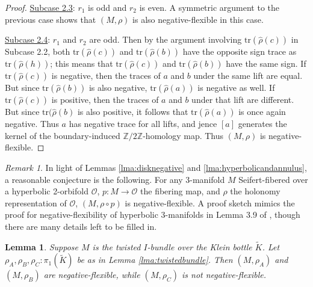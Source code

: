 \documentclass{article}
\theoremstyle{plain}
\theoremstyle{definition}
\theoremstyle{plain}
\theoremstyle{plain}
\theoremstyle{plain}
\newtheorem{lemma}[theorem]{Lemma}
\theoremstyle{remark}
\newtheorem{remark}[theorem]{Remark}
\theoremstyle{remark}
\theoremstyle{plain}
\theoremstyle{plain}
\begin{document}
\begin{proof}
\smallskip

\underline{Subcase 2.3}: $r_1$ is odd and $r_2$ is even. A symmetric argument to the previous case shows that $(M, \rho)$ is also negative-flexible in this case. 

\smallskip

\underline{Subcase 2.4}: $r_1$ and $r_2$ are odd. Then by the argument involving $\text{tr}(\hat{\rho}(c))$ in Subcase 2.2, both $\text{tr}(\hat{\rho}(c))$ and $\text{tr}(\hat{\rho}(b))$ have the opposite sign trace as $\text{tr}(\hat{\rho}(h))$; this means that $\text{tr}(\hat{\rho}(c))$ and $\text{tr}(\hat{\rho}(b))$ have the same sign. If $\text{tr}(\hat{\rho}(c))$ is negative, then the traces of $a$ and $b$ under the same lift are equal. But since $\text{tr}(\hat{\rho}(b))$ is also negative, $\text{tr}(\hat{\rho}(a))$ is negative as well. If $\text{tr}(\hat{\rho}(c))$ is positive, then the traces of $a$ and $b$ under that lift are different. But since $\text{tr}(\hat{\rho}(b)$ is also positive, it follows that $\text{tr}(\hat{\rho}(a))$ is once again negative. Thus $a$ has negative trace for all lifts, and jence $[a]$ generates the kernel of the boundary-induced $\mathbb{Z}/2\mathbb{Z}$-homology map. Thus $(M, \rho)$ is negative-flexible. 
\end{proof}

\begin{remark}
In light of Lemmas \ref{lma:disknegative} and \ref{lma:hyperbolicandannulus}, a reasonable conjecture is the following. For any 3-manifold $M$ Seifert-fibered over a hyperbolic 2-orbifold $\mathcal{O}$, $p: M \to \mathcal{O}$ the fibering map, and $\rho$ the holonomy representation of $\mathcal{O}$, $(M, \rho \circ p)$ is negative-flexible. A proof sketch mimics the proof for negative-flexibility of hyperbolic 3-manifolds in Lemma 3.9 of \cite{MenalFerrer2010TwistedCF}, though there are many details left to be filled in. 
\end{remark}

\begin{lemma}\label{lma:ibundlenegative}
Suppose $M$ is the twisted $I$-bundle over the Klein bottle $\tilde{K}$. Let $\rho_A, \rho_B, \rho_C: \pi_1(\tilde{K})$ be as in Lemma \ref{lma:twistedbundle}. Then $(M, \rho_A)$ and $(M, \rho_B)$ are negative-flexible, while $(M, \rho_C)$ is not negative-flexible. 
\end{lemma}
\end{document}

